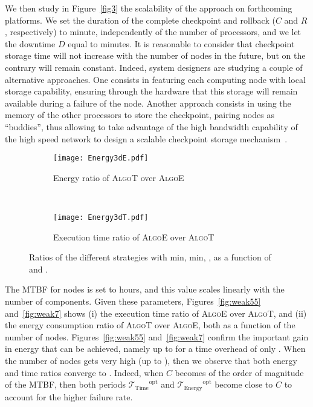 \documentclass[a4paper]{article}
\newcommand{\ema}[1]{\ensuremath{#1}\xspace}
\newcommand{\ccc}{\ema{C}}
\newcommand{\rrr}{\ema{R}}
\newcommand{\ddd}{\ema{D}}
\renewcommand{\time}[1][]{\ema{\mathcal{T}_{\text{#1}}}}
\newcommand{\toptT}{\ema{\time[Time]^{\text{opt}}}}
\newcommand{\toptE}{\ema{\time[Energy]^{\text{opt}}}}
\newcommand{\algoE}{\textsc{AlgoE}\xspace}
\newcommand{\algoT}{\textsc{AlgoT}\xspace}
\begin{document}
We then study in Figure~\ref{fig3} the scalability
of the approach on forthcoming platforms. 
We set the duration of the complete checkpoint and rollback
(\ccc and \rrr, respectively) to  minute, independently of the number of processors,
and we let the downtime \ddd equal to  minutes. 
It is reasonable to consider that checkpoint
storage time will not increase with the number of nodes in the future, but on the
contrary will remain constant. Indeed, system designers
are studying a couple of alternative approaches. One consists in
featuring each computing node with local storage capability, ensuring
through the hardware that this storage will remain available during a
failure of the node. Another approach consists in using the memory of
the other processors to store the checkpoint, pairing nodes as
``buddies'', thus allowing to take advantage of the high bandwidth
capability of the high speed network to design a scalable checkpoint
storage mechanism~\cite{ZhengShiKale2004,NiClusterFT12,buddy,OnePetabSecondCheckpoint}.


\begin{figure}
    \centering
  \begin{subfigure}[b]{0.7\textwidth}
    \centering
    \texttt{[image: Energy3dE.pdf]}
    \caption{Energy ratio of \algoT over \algoE}
\label{fig:3d:energy}
  \end{subfigure}\\
  \begin{subfigure}[b]{0.7\textwidth}
    \centering
    \texttt{[image: Energy3dT.pdf]}
    \caption{Execution time ratio of \algoE over \algoT} \label{fig:3d:time}
  \end{subfigure}
  \caption{Ratios of the different strategies with  min,  min, , 
  as a function of  and .   \label{fig:3d}}
\end{figure}


The MTBF for  nodes is set to  hours, and this value scales linearly with
the number of components. 
Given these parameters, Figures~\ref{fig:weak55} and~\ref{fig:weak7} 
shows (i) the execution time ratio of \algoE over \algoT, 
and (ii) the energy consumption ratio of \algoT over \algoE, both as a function of the 
number of nodes.
Figures~\ref{fig:weak55} and~\ref{fig:weak7} confirm the important gain in energy that can be achieved,
namely up to  for a time overhead of only .
When the number of nodes gets very high (up to ), then we observe that both energy and 
time ratios converge to . Indeed, when  \ccc becomes of the order of magnitude of the MTBF,
then both periods \toptT and \toptE become close to \ccc to account for the higher failure rate. 
\end{document}
